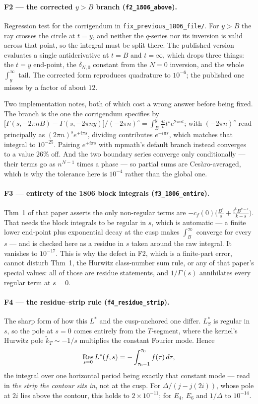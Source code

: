 \documentclass[11pt]{article}
\newcommand{\tk}{\widetilde{k}_T}
\newcommand{\code}[1]{\texttt{#1}}
\begin{document}
\paragraph{F2 --- the corrected $y>B$ branch (\code{f2\_1806\_above}).}
Regression test for the corrigendum in \code{fix\_previous\_1806\_file/}. For $y>B$ the ray
crosses the circle at $t=y$, and neither the $q$-series nor its inversion is valid across that
point, so the integral must be split there. The published version evaluates a single
antiderivative at $t=B$ and $t=\infty$, which drops three things: the $t=y$ end-point, the
$\delta_{N,0}$ constant from the $N=0$ inversion, and the whole $\int_y^\infty$ tail. The
corrected form reproduces quadrature to $10^{-6}$; the published one misses by a factor of
about $12$.

Two implementation notes, both of which cost a wrong answer before being fixed. The branch is
the one the corrigendum specifies by
$\big[\Gamma(s,-2\pi nB)-\Gamma(s,-2\pi ny)\big]/(-2\pi n)^s=\int_B^y\tfrac{dt}{t}t^se^{2\pi nt}$;
with $(-2\pi n)^s$ read principally as $(2\pi n)^se^{+i\pi s}$, dividing contributes
$e^{-i\pi s}$, which matches that integral to $10^{-25}$. Pairing $e^{+i\pi s}$ with mpmath's
default branch instead converges to a value $26\%$ off. And the two boundary series converge
only conditionally --- their terms go as $n^{N-1}$ times a phase --- so partial sums are
Ces\`aro-averaged, which is why the tolerance here is $10^{-4}$ rather than the global one.

\paragraph{F3 --- entirety of the 1806 block integrals (\code{f3\_1806\_entire}).}
Thm~1 of that paper asserts the only non-regular terms are
$-c_f(0)\big(\tfrac{B^s}{s}+\tfrac{i^kB^{k-s}}{k-s}\big)$. That needs the block integrals to be
regular in $s$, which is automatic --- a finite lower end-point plus exponential decay at the
cusp makes $\int_B^\infty$ converge for every $s$ --- and is checked here as a residue in $s$
taken around the raw integral. It vanishes to $10^{-17}$. This is why the defect in F2, which
is a finite-part error, cannot disturb Thm~1, the Hurwitz class-number sum rule, or any of that
paper's special values: all of those are residue statements, and $1/\Gamma(s)$ annihilates
every regular term at $s=0$.

\paragraph{F4 --- the residue--strip rule (\code{f4\_residue\_strip}).}
The sharp form of how this $L^*$ and the cusp-anchored one differ. $L^*_S$ is regular in $s$,
so the pole at $s=0$ comes entirely from the $T$-segment, where the kernel's Hurwitz pole
$\tk\sim-1/s$ multiplies the constant Fourier mode. Hence
\[
\mathop{\rm Res}_{s=0}L^*(f,s)=-\int_{\tau_0-1}^{\tau_0}f(\tau)\,d\tau ,
\]
the integral over one horizontal period being exactly that constant mode --- read in
\emph{the strip the contour sits in}, not at the cusp. For $\Delta/(j-j(2i))$, whose pole at
$2i$ lies above the contour, this holds to $2\times10^{-11}$; for $E_4$, $E_6$ and $1/\Delta$
to $10^{-14}$.
\end{document}
